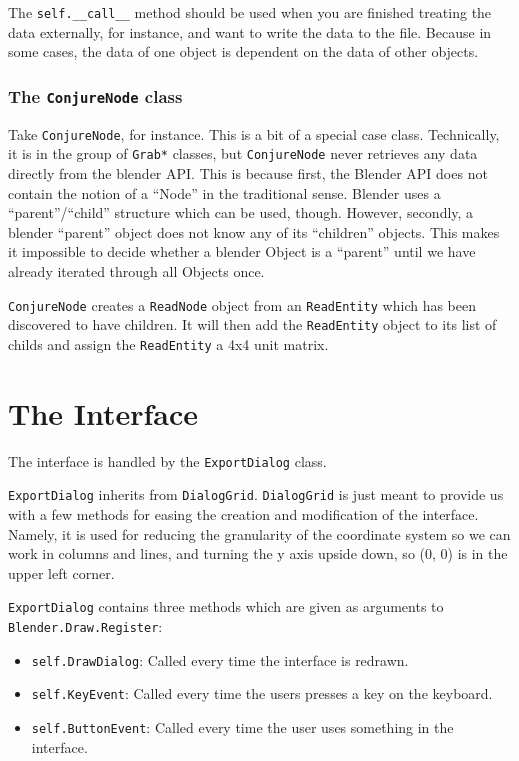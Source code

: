 The \texttt{self.\_\_call\_\_} method should be used when you are finished treating the data externally, for instance, and want to write the data to the file. Because in some cases, the data of one object is dependent on the data of other objects.

\subsubsection*{The \texttt{ConjureNode} class}
Take \texttt{ConjureNode}, for instance. This is a bit of a special case class. Technically, it is in the group of \texttt{Grab*} classes, but \texttt{ConjureNode} never retrieves any data directly from the blender API. This is because first, the Blender API does not contain the notion of a ``Node'' in the traditional sense. Blender uses a ``parent''/``child'' structure which can be used, though. However, secondly, a blender ``parent'' object does not know any of its ``children'' objects. This makes it impossible to decide whether a blender Object is a ``parent'' until we have already iterated through all Objects once.

\texttt{ConjureNode} creates a \texttt{ReadNode} object from an \texttt{ReadEntity} which has been discovered to have children. It will then add the \texttt{ReadEntity} object to its list of childs and assign the \texttt{ReadEntity} a 4x4 unit matrix.

\section*{The Interface}
The interface is handled by the \texttt{ExportDialog} class.

\texttt{ExportDialog} inherits from \texttt{DialogGrid}. \texttt{DialogGrid} is just meant to provide us with a few methods for easing the creation and modification of the interface. Namely, it is used for reducing the granularity of the coordinate system so we can work in columns and lines, and turning the y axis upside down, so (0, 0) is in the upper left corner.

\texttt{ExportDialog} contains three methods which are given as arguments to \texttt{Blender.Draw.Register}:
\begin{itemize}
\item \texttt{self.DrawDialog}: Called every time the interface is redrawn.
\item \texttt{self.KeyEvent}: Called every time the users presses a key on the keyboard.
\item \texttt{self.ButtonEvent}: Called every time the user uses something in the interface.
\end{itemize}

